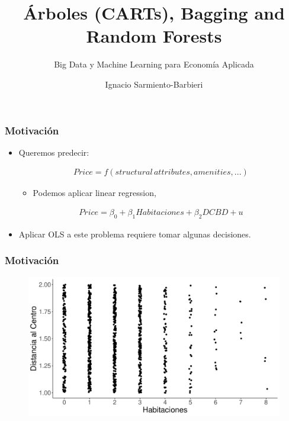 \documentclass[
  shownotes,
  xcolor={svgnames},
  hyperref={colorlinks,citecolor=DarkBlue,linkcolor=andesred,urlcolor=DarkBlue}
  , aspectratio=169]{beamer}
\begin{document}
\title{Árboles (CARTs), Bagging and Random Forests}
\subtitle{Big Data y Machine Learning para Economía Aplicada}
\date{}

\author[Sarmiento-Barbieri]{Ignacio Sarmiento-Barbieri}


\begin{frame}[noframenumbering]
\maketitle
\end{frame}




\begin{frame}
\frametitle{Motivación}


\begin{itemize}
    \item Queremos predecir:

    \begin{align}
    Price=f(structural\,attributes,amenities,...)
    \end{align}
    \medskip
    \begin{itemize}
      \item Podemos aplicar linear regression,
    \end{itemize}
    \begin{align}
    Price=\beta_0 + \beta_1 Habitaciones + \beta_2 DCBD + u
    \end{align}
  \medskip

  \item Aplicar OLS a este problema requiere tomar algunas decisiones.
  


\end{itemize}
\end{frame}
\begin{frame}
\frametitle{Motivación}

 \begin{figure}[H] \centering
            \captionsetup{justification=centering}
              \includegraphics[scale=0.35]{figures/dcbd_hab.pdf}                           
 \end{figure}


\end{frame}
\end{document}
